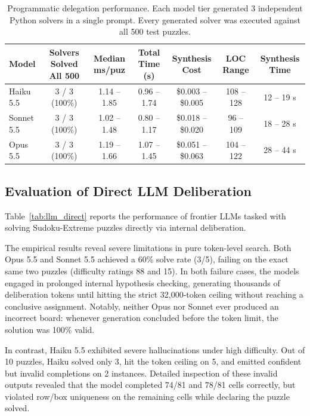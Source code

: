 \documentclass{article} %
\begin{document}
\begin{table}[t]
\centering
\small
\caption{Programmatic delegation performance. Each model tier generated 3 independent Python solvers in a single prompt. Every generated solver was executed against all 500 test puzzles.}
\label{tab:llm_code}
\begin{tabular}{lcccccc}
\toprule
\textbf{Model} & \textbf{Solvers Solved All 500} & \textbf{Median ms/puz} & \textbf{Total Time (s)} & \textbf{Synthesis Cost} & \textbf{LOC Range} & \textbf{Synthesis Time} \\
\midrule
Haiku 5.5  & 3 / 3 (100\%) & 1.14 -- 1.85 & 0.96 -- 1.74 & \$0.003 -- \$0.005 & 108 -- 128 & 12 -- 19 s \\
Sonnet 5.5 & 3 / 3 (100\%) & 1.02 -- 1.48 & 0.80 -- 1.17 & \$0.018 -- \$0.020 & 96 -- 109  & 18 -- 28 s \\
Opus 5.5   & 3 / 3 (100\%) & 1.19 -- 1.66 & 1.07 -- 1.45 & \$0.051 -- \$0.063 & 104 -- 122 & 28 -- 44 s \\
\bottomrule
\end{tabular}
\end{table}

\subsection{Evaluation of Direct LLM Deliberation}
Table~\ref{tab:llm_direct} reports the performance of frontier LLMs tasked with solving Sudoku-Extreme puzzles directly via internal deliberation. 

The empirical results reveal severe limitations in pure token-level search. Both Opus 5.5 and Sonnet 5.5 achieved a 60\% solve rate (3/5), failing on the exact same two puzzles (difficulty ratings 88 and 15). In both failure cases, the models engaged in prolonged internal hypothesis checking, generating thousands of deliberation tokens until hitting the strict 32,000-token ceiling without reaching a conclusive assignment. Notably, neither Opus nor Sonnet ever produced an incorrect board: whenever generation concluded before the token limit, the solution was 100\% valid.

In contrast, Haiku 5.5 exhibited severe hallucinations under high difficulty. Out of 10 puzzles, Haiku solved only 3, hit the token ceiling on 5, and emitted confident but invalid completions on 2 instances. Detailed inspection of these invalid outputs revealed that the model completed 74/81 and 78/81 cells correctly, but violated row/box uniqueness on the remaining cells while declaring the puzzle solved.
\end{document}
